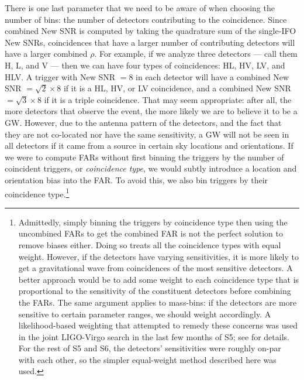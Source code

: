 There is one last parameter that we need to be aware of when choosing the number of bins: the number of detectors contributing to the coincidence. Since combined New \ac{SNR} is computed by taking the quadrature sum of the single-\ac{IFO} New \acp{SNR}, coincidences that have a larger number of contributing detectors will have a larger combined $\rho$. For example, if we analyze three detectors --- call them H, L, and V --- then we can have four types of coincidences: HL, HV, LV, and HLV. A trigger with New \ac{SNR} $= 8$ in each detector will have a combined New \ac{SNR} $= \sqrt{2}\times8$ if it is a HL, HV, or LV coincidence, and a combined New \ac{SNR} $= \sqrt{3}\times8$ if it is a triple coincidence. That may seem appropriate: after all, the more detectors that observe the event, the more likely we are to believe it to be a \ac{GW}. However, due to the antenna pattern of the detectors, and the fact that they are not co-located nor have the same sensitivity, a \ac{GW} will not be seen in all detectors if it came from a source in certain sky locations and orientations. If we were to compute \acp{FAR} without first binning the triggers by the number of coincident triggers, or \emph{coincidence type}, we would subtly introduce a location and orientation bias into the \ac{FAR}. To avoid this, we also bin triggers by their coincidence type.\footnote{Admittedly, simply binning the triggers by coincidence type then using the uncombined \acp{FAR} to get the combined \ac{FAR} is not the perfect solution to remove biases either. Doing so treats all the coincidence types with equal weight. However, if the detectors have varying sensitivities, it is more likely to get a gravitational wave from coincidences of the most sensitive detectors. A better approach would be to add some weight to each coincidence type that is proportional to the sensitivity of the constituent detectors before combining the \acp{FAR}. The same argument applies to mass-bins: if the detectors are more sensitive to certain parameter ranges, we should weight accordingly. A likelihood-based weighting that attempted to remedy these concerns was used in the joint LIGO-Virgo search in the last few months of \ac{S5}; see \cite{ref:LVC_paper} for details. For the rest of \ac{S5} and \ac{S6}, the detectors' sensitivities were roughly on-par with each other, so the simpler equal-weight method described here was used.}

